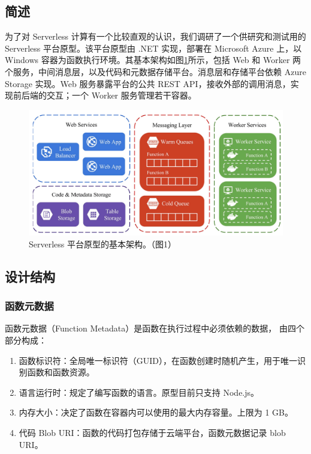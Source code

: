 \documentclass[11pt]{article}
\begin{document}
\subsection{简述}
为了对 Serverless 计算有一个比较直观的认识，我们调研了一个供研究和测试用的 Serverless 平台原型\cite{mcgrath2017serverless}。该平台原型由 .NET 实现，部署在 Microsoft Azure 上，以 Windows 容器为函数执行环境。其基本架构如图\ref{figs:mcgrath2017_structure}所示，包括 Web 和 Worker 两个服务，中间消息层，以及代码和元数据存储平台。消息层和存储平台依赖 Azure Storage 实现。Web 服务暴露平台的公共 REST API，接收外部的调用消息，实现前后端的交互；一个 Worker 服务管理若干容器。
\begin{figure}[!htbp]
	\centering
	\includegraphics[width=0.9\linewidth]{figs/2017serverless_structure}
	\caption{Serverless 平台原型的基本架构。（\cite{mcgrath2017serverless}图1）}
	\label{figs:mcgrath2017_structure}
\end{figure}

\subsection{设计结构}
\subsubsection{函数元数据}
函数元数据（Function Metadata）是函数在执行过程中必须依赖的数据， 由四个部分构成：
\begin{enumerate}
	\item 函数标识符：全局唯一标识符（GUID），在函数创建时随机产生，用于唯一识别函数和函数资源。
	\item 语言运行时：规定了编写函数的语言。原型目前只支持 Node.js。
	\item 内存大小：决定了函数在容器内可以使用的最大内存容量。上限为 1 GB。
	\item 代码 Blob URI：函数的代码打包存储于云端平台，函数元数据记录 blob URI。
\end{enumerate}
\end{document}
